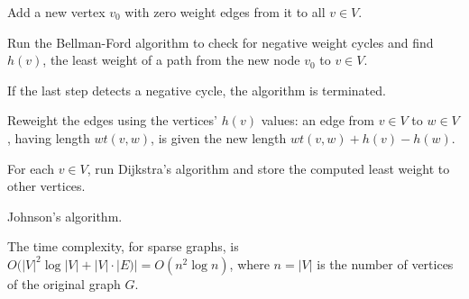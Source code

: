 \begin{algorithm}[!htpb]
\dontprintsemicolon  %
\BlankLine
Add a new vertex $v_0$ with zero weight edges from it to all $v \in V$.\;

Run the Bellman-Ford algorithm to check for negative weight cycles
and find $h(v)$, the least weight of a path from the new node $v_0$ to
$v \in V$.

If the last step detects a negative cycle, the algorithm is terminated.\;

Reweight the edges using the vertices' $h(v)$ values: an edge from
$v \in V$ to $w \in V$, having length $wt(v,w)$, is given the new length
$wt(v,w) + h(v) - h(w)$.\;

For each $v \in V$, run Dijkstra's algorithm and store the computed
least weight to other vertices.
\caption{Johnson's algorithm.}
\label{alg:graph_algorithms:johnson}
\end{algorithm}

The time complexity, for sparse graphs, is
$O(|V|^2\log |V| + |V| \cdot |E)|=O(n^2\log n)$, where $n = |V|$ is
the number of vertices of the original graph $G$.
